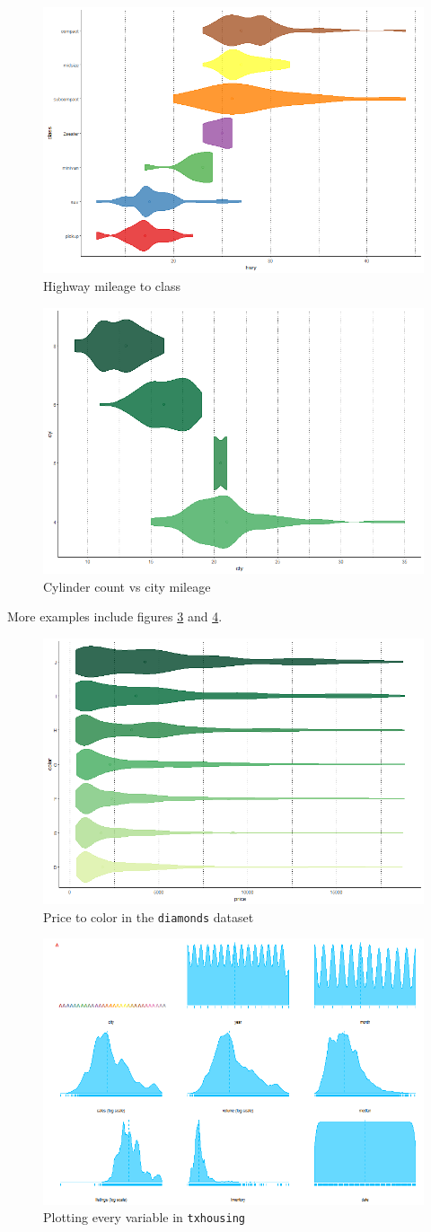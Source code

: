 \begin{figure}[htbp!]
    \centering
    \includegraphics[width=.5\textwidth]{pictures/plotluck/mpg1}
    \caption{Highway mileage to class}
    \label{fig:mpg2}
\end{figure}

\begin{figure}[htbp!]
    \centering
    \includegraphics[width=.5\textwidth]{pictures/plotluck/mpg2}
    \caption{Cylinder count vs city mileage}
    \label{fig:mpg3}
\end{figure}

More examples include figures \ref{diamondprice} and \ref{txhousing}.

\begin{figure}[htbp!]
    \centering
    \includegraphics[width=.5\textwidth]{pictures/plotluck/diamonds1}
    \caption{Price to color in the \texttt{diamonds} dataset}
    \label{diamondprice}
\end{figure}

\begin{figure}[htbp!]
    \centering
    \includegraphics[width=.5\textwidth]{pictures/plotluck/txhousingall}
    \caption{Plotting every variable in \texttt{txhousing}}
    \label{txhousing}
\end{figure}

